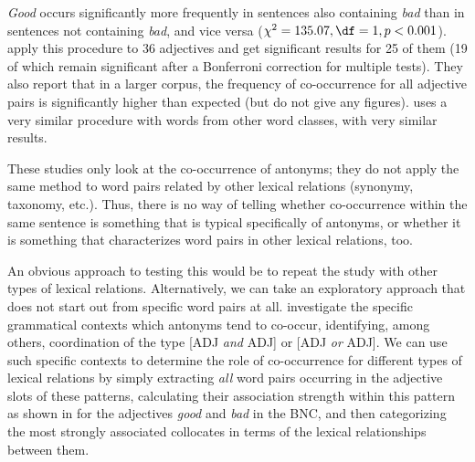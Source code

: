 \textit{Good} occurs significantly more frequently in sentences also containing \textit{bad} than in sentences not containing \textit{bad}, and vice versa ($\chi^2 = 135.07, \df = 1, p < 0.001$).  \citet{justeson_co-occurrences_1991} apply this procedure to 36 adjectives  and get significant results for 25 of them (19 of which remain significant after a Bonferroni  correction for multiple tests). They also report that in a larger  corpus, the frequency of co\hyp{}occurrence for all adjective  pairs is significantly higher than expected  (but do not give any figures). \citet{fellbaum_co-occurrence_1995} uses a very similar procedure with words from other word classes, with very similar results.

These studies only look at the co\hyp{}occurrence of antonyms;  they do not apply the same method to word pairs related by other lexical relations (synonymy,  taxonomy, etc.). Thus, there is no way of telling whether co\hyp{}occurrence within the same sentence is something that is typical specifically of antonyms,  or whether it is something that characterizes word pairs in other lexical relations, too.

An obvious approach to testing this would be to repeat the study with other types of lexical relations. Alternatively, we can take an exploratory approach that does not start out from specific word pairs at all. \citet{justeson_co-occurrences_1991} investigate the specific grammatical contexts which antonyms  tend to co\hyp{}occur, identifying, among others, coordination  of the type [ADJ \textit{and} ADJ] or [ADJ \textit{or} ADJ]. We can use such specific contexts to determine the role of co\hyp{}occurrence for different types of lexical relations by simply extracting  \textit{all} word pairs occurring in the adjective  slots of these patterns, calculating their association  strength within this pattern as shown in  for the adjectives  \textit{good} and \textit{bad} in the BNC,  and then categorizing  the most strongly associated  collocates  in terms of the lexical relationships between them.

